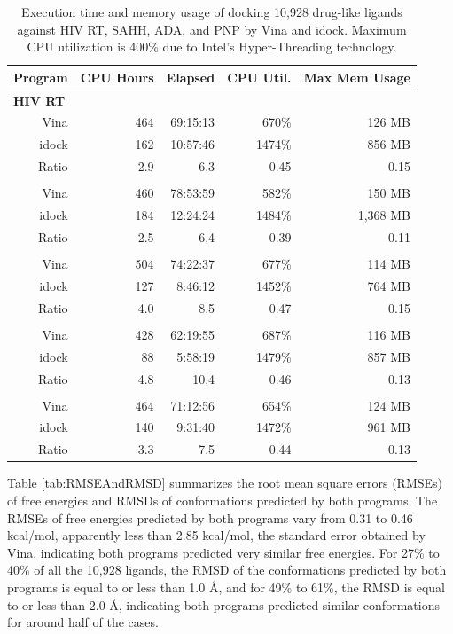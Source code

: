 \documentclass[10pt,conference,compsocconf]{../IEEEtran}
\begin{document}
\begin{table}
\centering
\begin{tabular*}
{\linewidth}
{@{\extracolsep{\fill}}rrrrr}
\toprule
Program & CPU Hours & Elapsed & CPU Util. & Max Mem Usage\\
\midrule
\multicolumn{5}{l}{\textbf{HIV RT}}\\
Vina  & 464 & 69:15:13 &  670\% & 126 MB\\
idock & 162 & 10:57:46 & 1474\% & 856 MB\\
Ratio & 2.9 &      6.3 & 0.45   & 0.15\\
\noalign{\smallskip\smallskip}
\multicolumn{5}{l}{\textbf{SAHH}}\\
Vina  & 460 & 78:53:59 &  582\% &   150 MB\\
idock & 184 & 12:24:24 & 1484\% & 1,368 MB\\
Ratio & 2.5 &      6.4 &  0.39  & 0.11\\
\noalign{\smallskip\smallskip}
\multicolumn{5}{l}{\textbf{ADA}}\\
Vina  & 504 & 74:22:37 &  677\% & 114 MB\\
idock & 127 &  8:46:12 & 1452\% & 764 MB\\
Ratio & 4.0 &      8.5 &  0.47  & 0.15\\
\noalign{\smallskip\smallskip}
\multicolumn{5}{l}{\textbf{PNP}}\\
Vina  & 428 & 62:19:55 &  687\% & 116 MB\\
idock &  88 &  5:58:19 & 1479\% & 857 MB\\
Ratio & 4.8 &     10.4 &  0.46  & 0.13\\
\noalign{\smallskip\smallskip}
\multicolumn{5}{l}{\textbf{Average}}\\
Vina  & 464 & 71:12:56 &  654\% & 124 MB\\
idock & 140 &  9:31:40 & 1472\% & 961 MB\\
Ratio & 3.3 &      7.5 & 0.44   & 0.13\\
\bottomrule
\end{tabular*}
\caption{Execution time and memory usage of docking 10,928 drug-like ligands against HIV RT, SAHH, ADA, and PNP by Vina and idock. Maximum CPU utilization is 400\% due to Intel's Hyper-Threading technology.}
\label{tab:ExecutionTimeAndMemoryUsage}
\end{table}

Table \ref{tab:RMSEAndRMSD} summarizes the root mean square errors (RMSEs) of free energies and RMSDs of conformations predicted by both programs. The RMSEs of free energies predicted by both programs vary from 0.31 to 0.46 kcal/mol, apparently less than 2.85 kcal/mol, the standard error obtained by Vina, indicating both programs predicted very similar free energies. For 27\% to 40\% of all the 10,928 ligands, the RMSD of the conformations predicted by both programs is equal to or less than 1.0 \AA, and for 49\% to 61\%, the RMSD is equal to or less than 2.0 \AA, indicating both programs predicted similar conformations for around half of the cases.
\end{document}
